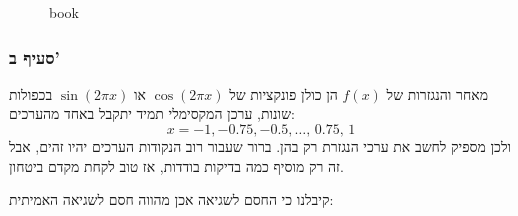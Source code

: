 \documentclass[
]{article}
\begin{document}
\begin{figure}
\centering
{}
\caption{book}
\end{figure}


\subsubsection{סעיף ב'}\label{ux5e1ux5e2ux5d9ux5e3-ux5d1}

מאחר והנגזרות של \(f(x)\) הן כולן פונקציות של \(\cos(2\pi x)\) או
\(\sin(2\pi x)\) בכפולות שונות, ערכן המקסימלי תמיד יתקבל באחד מהערכים:
\[x=-1,-0.75,-0.5,\dots,\, 0.75,\, 1 \] ולכן מספיק לחשב את ערכי הנגזרת
רק בהן. ברור שעבור רוב הנקודות הערכים יהיו זהים, אבל זה רק מוסיף כמה
בדיקות בודדות, אז טוב לקחת מקדם ביטחון.


קיבלנו כי החסם לשגיאה אכן מהווה חסם לשגיאה האמיתית:
\end{document}
